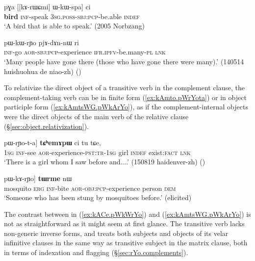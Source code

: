 \begin{exe}
\ex \label{ex:kArWCmi.kWspa}
\gll pɣa [[kɤ-rɯɕmi] ɯ-kɯ-spa] ci \\
\textbf{bird} \textsc{inf}-speak \textsc{3sg}.\textsc{poss}-\textsc{sbj}:\textsc{pcp}-be.able \textsc{indef} \\
\glt `A bird that is able to speak.' (2005 Norbzang)
\end{exe}

\begin{exe}
\ex \label{ex:kACe.pWkWrYo}
\gll [kɤ-ɕe] pɯ-kɯ-rɲo pjɤ-dɤn-nɯ ri \\
\textsc{inf}-go \textsc{aor}-\textsc{sbj}:\textsc{pcp}-experience \textsc{ifr}.\textsc{ipfv}-be.many-\textsc{pl} \textsc{lnk} \\
\glt `Many people have gone there (those who have gone there were many).' (140514 huishuohua de niao-zh)
()
\end{exe}

To relativize the direct object of a transitive verb in the complement clause, the complement-taking verb can be in finite form (\ref{ex:kAmto.pWrYota}) or in object participle form (\ref{ex:kAmtsWG.pWkArYo}), as if the complement-internal objects were the direct objects of the main verb of the relative clause (§\ref{sec:object.relativization}). 

\begin{exe}
\ex \label{ex:kAmto.pWrYota}
\gll [aʑo [kɤ-mto] pɯ-rɲo-t-a] \textbf{tɕʰemɤpɯ} ci tu tɕe, \\
\textsc{1sg} \textsc{inf}-see \textsc{aor}-experience-\textsc{pst}:\textsc{tr}-\textsc{1sg} girl \textsc{indef} exist:\textsc{fact} \textsc{lnk} \\
\glt `There is a girl whom I saw before and....' (150819 haidenver-zh)
()
\end{exe}

\begin{exe}
\ex \label{ex:kAmtsWG.pWkArYo}
\gll [[ʁmɤrɲɯɣ kɯ kɤ-mtsɯɣ] pɯ-kɤ-rɲo] \textbf{tɯrme} nɯ \\
mosquito \textsc{erg} \textsc{inf}-bite \textsc{aor}-\textsc{obj}:\textsc{pcp}-experience person \textsc{dem} \\
\glt `Someone who has been stung by mosquitoes before.' (elicited)
\end{exe}

The contrast between  in (\ref{ex:kACe.pWkWrYo}) and   (\ref{ex:kAmtsWG.pWkArYo}) is not as straightforward as it might seem at first glance. The transitive verb  lacks non-generic inverse forms, and treats both subjects and objects of its velar infinitive clauses in the same way as transitive subject in the matrix clause, both in terms of indexation and flagging (§\ref{sec:rYo.complements}). 

